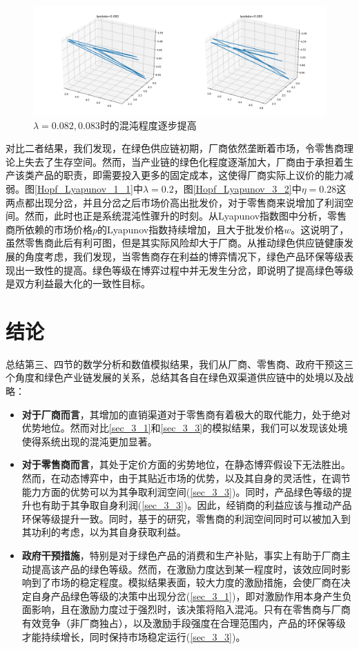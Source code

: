\documentclass{article}
\begin{document}
\begin{figure}[htp]
    \centering
    \includegraphics[width=16.5cm]{Hopf_Lyapunov_3_3.png}
    \caption{$\lambda=0.082, 0.083$时的混沌程度逐步提高}
    \label{Hopf_Lyapunov_3_3}
\end{figure}
\par 对比二者结果，我们发现，在绿色供应链初期，厂商依然垄断着市场，令零售商理论上失去了生存空间。然而，当产业链的绿色化程度逐渐加大，厂商由于承担着生产该类产品的职责，即需要投入更多的固定成本，这使得厂商实际上议价的能力减弱。图\ref{Hopf_Lyapunov_1_1}中$\lambda=0.2$，图\ref{Hopf_Lyapunov_3_2}中$\eta=0.28$这两点都出现分岔，并且分岔之后市场价高出批发价，对于零售商来说增加了利润空间。然而，此时也正是系统混沌性骤升的时刻。从Lyapunov指数图中分析，零售商所依赖的市场价格$p$的Lyapunov指数持续增加，且大于批发价格$w$。这说明了，虽然零售商此后有利可图，但是其实际风险却大于厂商。从推动绿色供应链健康发展的角度考虑，我们发现，当零售商存在利益的博弈情况下，绿色产品环保等级表现出一致性的提高。绿色等级在博弈过程中并无发生分岔，即说明了提高绿色等级是双方利益最大化的一致性目标。
\section{结论}
\par 总结第三、四节的数学分析和数值模拟结果，我们从厂商、零售商、政府干预这三个角度和绿色产业链发展的关系，总结其各自在绿色双渠道供应链中的处境以及战略：
\begin{itemize}
    \item \textbf{对于厂商而言}，其增加的直销渠道对于零售商有着极大的取代能力，处于绝对优势地位。然而对比\ref{sec_3_1}和\ref{sec_3_3}的模拟结果，我们可以发现该处境使得系统出现的混沌更加显著。
    \item \textbf{对于零售商而言}，其处于定价方面的劣势地位，在静态博弈假设下无法胜出。然而，在动态博弈中，由于其贴近市场的优势，以及其自身的灵活性，在调节能力方面的优势可以为其争取利润空间(\ref{sec_3_3})。同时，产品绿色等级的提升也有助于其争取自身利润(\ref{sec_3_3})。因此，经销商的利益应该与推动产品环保等级提升一致。同时，基于\cite{2018Huang}\cite{2018Li}的研究，零售商的利润空间同时可以被加入到其功利的考虑，以为其自身获取利益。
    \item \textbf{政府干预措施}，特别是对于绿色产品的消费和生产补贴，事实上有助于厂商主动提高该产品的绿色等级。然而，在激励力度达到某一程度时，该效应同时影响到了市场的稳定程度。模拟结果表面，较大力度的激励措施，会使厂商在决定自身产品绿色等级的决策中出现分岔(\ref{sec_3_1})，即对激励作用本身产生负面影响，且在激励力度过于强烈时，该决策将陷入混沌。只有在零售商与厂商有效竞争（非厂商独占），以及激励手段强度在合理范围内，产品的环保等级才能持续增长，同时保持市场稳定运行(\ref{sec_3_3})。
\end{itemize}
\par
\end{document}
